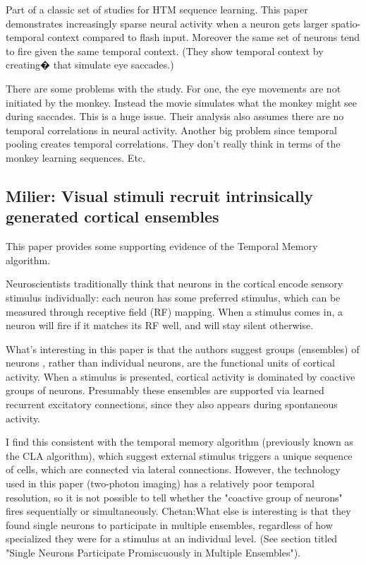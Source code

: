 \documentclass{article} %
\begin{document}
Part of a classic set of studies for HTM sequence learning. This paper
\cite{Vinje2002}
demonstrates increasingly sparse neural activity when a neuron gets larger
spatio-temporal context compared to flash input. Moreover the same set of
neurons tend to fire given the same temporal context. (They show temporal
context by creating� that simulate eye saccades.)

There are some problems with the study. For one, the eye movements are not
initiated by the monkey. Instead the movie simulates what the monkey might see
during saccades. This is a huge issue. Their analysis also assumes there are no
temporal correlations in neural activity. Another big problem since temporal
pooling creates temporal correlations. They don't really think in terms of the
monkey learning sequences. Etc.

\subsection{Milier: Visual stimuli recruit intrinsically generated cortical ensembles}

This paper \cite{Miller2014} provides some supporting evidence of the Temporal Memory algorithm. 

Neuroscientists traditionally think that neurons in the cortical encode sensory
stimulus individually: each neuron has some preferred stimulus, which can be
measured through receptive field (RF) mapping. When a stimulus comes in, a
neuron will fire if it matches its RF well, and will stay silent otherwise.

What's interesting in this paper is that the authors suggest groups (ensembles)
of neurons , rather than individual neurons, are the functional units of
cortical activity. When a stimulus is presented, cortical activity is dominated
by coactive groups of neurons.  Presumably these ensembles are supported via
learned recurrent excitatory connections, since they also appears during
spontaneous activity.

I find this consistent with the temporal memory algorithm (previously known as
the CLA algorithm), which suggest external stimulus triggers a unique sequence
of cells, which are connected via lateral connections. However, the technology
used in this paper (two-photon imaging) has a relatively poor temporal
resolution, so it is not possible to tell whether the "coactive group of
neurons" fires sequentially or simultaneously.
Chetan:What else is interesting is that they found single neurons to participate
in multiple ensembles, regardless of how specialized they were for a stimulus at
an individual level. (See section titled "Single Neurons Participate
Promiscuously in Multiple Ensembles").
\end{document}

